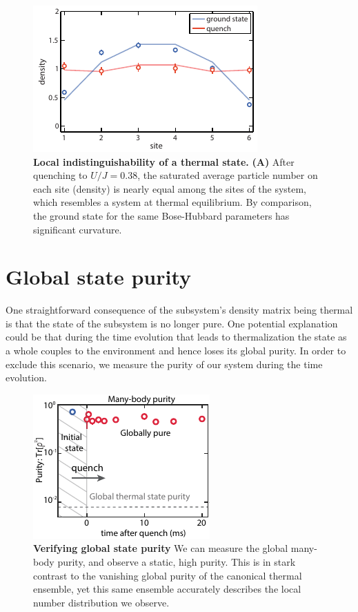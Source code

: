 \begin{figure}[t!]
	\centering
	\includegraphics[scale=1.5]{figures/ETH_density.pdf}
	\caption{{\bf Local indistinguishability of a thermal state.} {\bf(A)} After quenching to $U/J=0.38$, the saturated average particle number on each site (density) is nearly equal among the sites of the system, which resembles a system at thermal equilibrium. By comparison, the ground state for the same Bose-Hubbard parameters has significant curvature.}
	\label{fig:ETH_density}
\end{figure} 

\section{Global state purity}

One straightforward consequence of the subsystem's density matrix being thermal is that the state of the subsystem is no longer pure. One potential explanation could be that during the time evolution that leads to thermalization the state as a whole couples to the environment and hence loses its global purity. In order to exclude this scenario, we measure the purity of our system during the time evolution. 

\begin{figure}[h!]
	\centering
	\includegraphics[scale=2]{figures/ETH_purity.pdf}
	\caption{{\bf Verifying global state purity}  We can measure the global many-body purity, and observe a static, high purity. This is in stark contrast to the vanishing global purity of the canonical thermal ensemble, yet this same ensemble accurately describes the local number distribution we observe.
	}
	
	\label{fig:ETH_purity}
\end{figure}  

